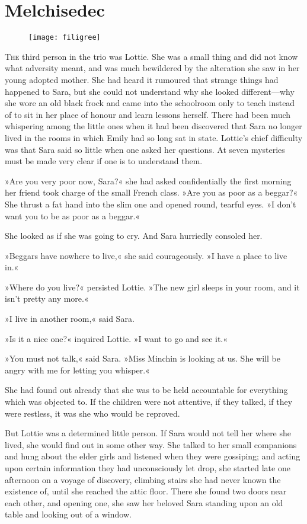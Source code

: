 \chapter{Melchisedec}

\begin{figure}[t!]
\centering
\texttt{[image: filigree]}
\end{figure}

\lettrine[lines=5]{T}{he} third person in the trio was Lottie. She was a small thing and did not know what adversity meant, and was much bewildered by the alteration she saw in her young adopted mother. She had heard it rumoured that strange things had happened to Sara, but she could not understand why she looked different—why she wore an old black frock and came into the schoolroom only to teach instead of to sit in her place of honour and learn lessons herself. There had been much whispering among the little ones when it had been discovered that Sara no longer lived in the rooms in which Emily had so long sat in state. Lottie's chief difficulty was that Sara said so little when one asked her questions. At seven mysteries must be made very clear if one is to understand them.

»Are you very poor now, Sara?« she had asked confidentially the first morning her friend took charge of the small French class. »Are you as poor as a beggar?« She thrust a fat hand into the slim one and opened round, tearful eyes. »I don't want you to be as poor as a beggar.«

She looked as if she was going to cry. And Sara hurriedly consoled her.

»Beggars have nowhere to live,« she said courageously. »I have a place to live in.«

»Where do you live?« persisted Lottie. »The new girl sleeps in your room, and it isn't pretty any more.«

»I live in another room,« said Sara.

»Is it a nice one?« inquired Lottie. »I want to go and see it.«

»You must not talk,« said Sara. »Miss Minchin is looking at us. She will be angry with me for letting you whisper.«

She had found out already that she was to be held accountable for everything which was objected to. If the children were not attentive, if they talked, if they were restless, it was she who would be reproved.

But Lottie was a determined little person. If Sara would not tell her where she lived, she would find out in some other way. She talked to her small companions and hung about the elder girls and listened when they were gossiping; and acting upon certain information they had unconsciously let drop, she started late one afternoon on a voyage of discovery, climbing stairs she had never known the existence of, until she reached the attic floor. There she found two doors near each other, and opening one, she saw her beloved Sara standing upon an old table and looking out of a window.

